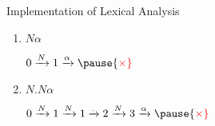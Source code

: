 \documentclass{beamer}
\begin{document}
\begin{frame}{Implementation of Lexical Analysis}
\begin{enumerate}
\pause
\item $N\alpha$
\begin{minipage}{0.5\linewidth}
\begin{flushright}
$0 \xrightarrow{N} 1 \xrightarrow{\alpha} \pause {\color{Red}\times}$
\end{flushright}
\end{minipage}

\pause
\item $N.N\alpha$
\begin{minipage}{0.5\linewidth}
\begin{flushright}
$0 \xrightarrow{N} 1 \xrightarrow{N} 1  \xrightarrow{.} 2 \xrightarrow{N} 3 \xrightarrow{\alpha} \pause {\color{Red}\times}$
\end{flushright}
\end{minipage}
\end{enumerate}
\end{frame}
\end{document}
